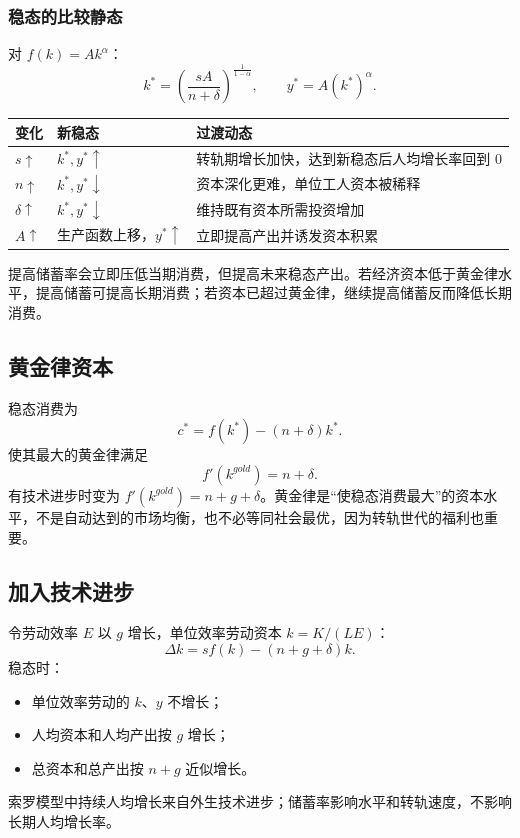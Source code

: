 \documentclass[UTF8,11pt,a4paper]{ctexart}
\begin{document}
\subsubsection{稳态的比较静态}
对 $f(k)=Ak^\alpha$：
\[
k^*=\left(\frac{sA}{n+\delta}\right)^{\frac1{1-\alpha}},
\qquad y^*=A(k^*)^\alpha.
\]
\begin{longtable}{p{}p{}p{}}
\toprule
变化 & 新稳态 & 过渡动态\\
\midrule
$s\uparrow$ & $k^*,y^*\uparrow$ & 转轨期增长加快，达到新稳态后人均增长率回到 0\\
$n\uparrow$ & $k^*,y^*\downarrow$ & 资本深化更难，单位工人资本被稀释\\
$\delta\uparrow$ & $k^*,y^*\downarrow$ & 维持既有资本所需投资增加\\
$A\uparrow$ & 生产函数上移，$y^*\uparrow$ & 立即提高产出并诱发资本积累\\
\bottomrule
\end{longtable}

\begin{warningbox}[储蓄率的两面性]
提高储蓄率会立即压低当期消费，但提高未来稳态产出。若经济资本低于黄金律水平，提高储蓄可提高长期消费；若资本已超过黄金律，继续提高储蓄反而降低长期消费。
\end{warningbox}

\subsection{黄金律资本}
稳态消费为
\[
c^*=f(k^*)-(n+\delta)k^*.
\]
使其最大的黄金律满足
\[
f'(k^{gold})=n+\delta.
\]
有技术进步时变为 $f'(k^{gold})=n+g+\delta$。黄金律是“使稳态消费最大”的资本水平，不是自动达到的市场均衡，也不必等同社会最优，因为转轨世代的福利也重要。

\subsection{加入技术进步}
令劳动效率 $E$ 以 $g$ 增长，单位效率劳动资本 $k=K/(LE)$：
\[
\Delta k=sf(k)-(n+g+\delta)k.
\]
稳态时：
\begin{itemize}
  \item 单位效率劳动的 $k$、$y$ 不增长；
  \item 人均资本和人均产出按 $g$ 增长；
  \item 总资本和总产出按 $n+g$ 近似增长。
\end{itemize}
索罗模型中持续人均增长来自外生技术进步；储蓄率影响水平和转轨速度，不影响长期人均增长率。
\end{document}
